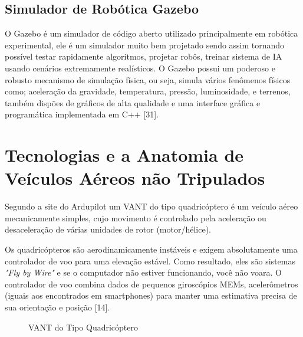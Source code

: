 \subsection{Simulador de Robótica Gazebo}
O Gazebo é um simulador de código aberto utilizado principalmente em robótica experimental, ele é um simulador muito bem projetado sendo assim tornando possível testar rapidamente algoritmos, projetar robôs, treinar sistema de IA usando cenários extremamente realísticos. O Gazebo possui um poderoso e robusto mecanismo de simulação física, ou seja, simula vários fenômenos físicos como; aceleração da gravidade, temperatura, pressão, luminosidade, e terrenos, também dispões de gráficos de alta qualidade e uma interface gráfica e programática implementada em C++ [31]. 
\section{Tecnologias e a Anatomia de Veículos Aéreos não Tripulados}
Segundo a site do Ardupilot um VANT do tipo quadricóptero é um veículo aéreo mecanicamente simples, cujo movimento é controlado pela aceleração ou desaceleração de várias unidades de rotor (motor/hélice).

Os quadricópteros são aerodinamicamente instáveis e exigem absolutamente uma controlador de voo para uma elevação estável. Como resultado, eles são sistemas \textit{"Fly by Wire"} e se o computador não estiver funcionando, você não voara. O controlador de voo combina dados de pequenos giroscópios MEMs, acelerômetros (iguais aos encontrados em smartphones) para manter uma estimativa precisa de sua orientação e posição [14].

%
\begin{figure}[H]
	\centering
	\caption{VANT do Tipo Quadricóptero}
	\fontsize{9pt}{12pt}\selectfont
	\def\svgwidth{15cm}
	
	\label{fig:quad}
\end{figure}

